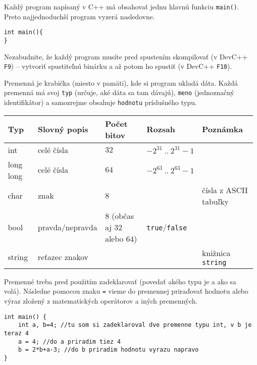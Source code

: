 




Každý program napísaný v C++ má obsahovať jednu hlavnú funkciu \texttt{main()}. Preto najjednoduchší
program vyzerá nasledovne.

\begin{lstlisting}
int main(){
}
\end{lstlisting}

Nezabudnite, že každý program musíte pred spustením skompilovať (v DevC++ \texttt{F9}) -- vytvoriť
spustiteľnú binárku a až potom ho spustiť (v DevC++ \texttt{F10}).


Premenná je krabička (miesto v pamäti), kde si program ukladá dáta. Každá premenná má svoj
\texttt{typ} (určuje, aké dáta sa tam dávajú), \texttt{meno} (jednoznačný identifikátor) a
samozrejme obsahuje \texttt{hodnotu} príslušného typu.

\begin{tabular}{|l|l|l|l|l|}
\hline
Typ & Slovný popis & Počet bitov & Rozsah & Poznámka \\ \hline
int & celé čísla & $32$ & $-2^{31}\ ..\ 2^{31}-1$ &  \\ \hline
long long & celé čísla & $64$ & $-2^{63}\ ..\ 2^{63}-1$ &  \\ \hline
char & znak & 8 & & čísla z ASCII tabuľky \\ \hline
bool & pravda/nepravda & $8$ (občas aj $32$ alebo $64$) & \texttt{true}/\texttt{false} & \\ \hline
string & reťazec znakov & & & knižnica \texttt{string} \\ \hline
\end{tabular}

Premenné treba pred použitím zadeklarovať (povedať akého typu je a ako sa volá). Následne pomocou
znaku \texttt{=} vieme do premennej priraďovať hodnotu alebo výraz zložený z matematických
operátorov a iných premenných.

\begin{lstlisting}
int main() {
    int a, b=4; //tu som si zadeklaroval dve premenne typu int, v b je teraz 4
    a = 4; //do a priradim tiez 4
    b = 2*b+a-3; //do b priradim hodnotu vyrazu napravo
}
\end{lstlisting}

